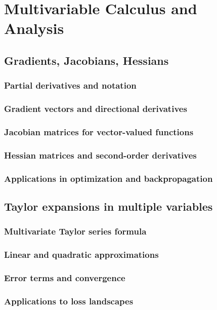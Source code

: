 ﻿\chapter{Multivariable Calculus and Analysis}
\section{Gradients, Jacobians, Hessians}
\subsection{Partial derivatives and notation}
\subsection{Gradient vectors and directional derivatives}
\subsection{Jacobian matrices for vector-valued functions}
\subsection{Hessian matrices and second-order derivatives}
\subsection{Applications in optimization and backpropagation}

\section{Taylor expansions in multiple variables}
\subsection{Multivariate Taylor series formula}
\subsection{Linear and quadratic approximations}
\subsection{Error terms and convergence}
\subsection{Applications to loss landscapes}

